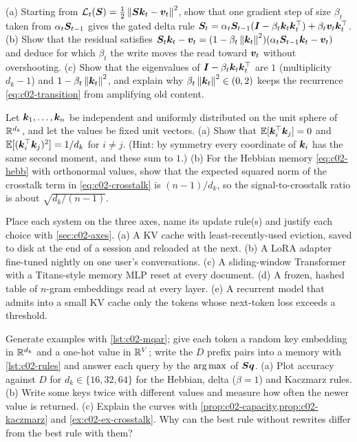 \begin{exercise}\label{ex:c02-ex-grad}
(a) Starting from $\mathcal{L}_t(\bm{S}) = \tfrac12\left\lVert \bm{S}\bm{k}_t - \bm{v}_t\right\rVert^2$, show that one gradient step of
size $\beta_t$ taken from $\alpha_t\bm{S}_{t-1}$ gives the gated delta rule
$\bm{S}_t = \alpha_t\bm{S}_{t-1}(\bm{I} - \beta_t\bm{k}_t\bm{k}_t^{\top}) + \beta_t\bm{v}_t\bm{k}_t^{\top}$.
(b) Show that the residual satisfies $\bm{S}_t\bm{k}_t - \bm{v}_t = (1 - \beta_t\left\lVert \bm{k}_t\right\rVert^2)(\alpha_t\bm{S}_{t-1}\bm{k}_t - \bm{v}_t)$
and deduce for which $\beta_t$ the write moves the read toward $\bm{v}_t$ without overshooting.
(c) Show that the eigenvalues of $\bm{I} - \beta_t\bm{k}_t\bm{k}_t^{\top}$ are $1$ (multiplicity $d_k - 1$) and
$1 - \beta_t\left\lVert \bm{k}_t\right\rVert^2$, and explain why $\beta_t\left\lVert \bm{k}_t\right\rVert^2 \in (0, 2)$ keeps the recurrence
\eqref{eq:c02-transition} from amplifying old content.
\end{exercise}

\begin{exercise}\label{ex:c02-ex-crosstalk}
Let $\bm{k}_1,\dots,\bm{k}_n$ be independent and uniformly distributed on the unit sphere of $\mathbb{R}^{d_k}$,
and let the values be fixed unit vectors.
(a) Show that $\mathbb{E}[\bm{k}_i^{\top}\bm{k}_j] = 0$ and $\mathbb{E}[(\bm{k}_i^{\top}\bm{k}_j)^2] = 1/d_k$ for $i \ne j$. (Hint: by
symmetry every coordinate of $\bm{k}_i$ has the same second moment, and these sum to $1$.)
(b) For the Hebbian memory \eqref{eq:c02-hebb} with orthonormal values, show that the expected
squared norm of the crosstalk term in \eqref{eq:c02-crosstalk} is $(n-1)/d_k$, so the
signal-to-crosstalk ratio is about $\sqrt{d_k/(n-1)}$.
\end{exercise}

\begin{exercise}\label{ex:c02-ex-classify}
Place each system on the three axes, name its update rule(s) and justify each choice with
\cref{sec:c02-axes}. (a) A KV cache with least-recently-used eviction, saved to disk at the end of a
session and reloaded at the next. (b) A LoRA adapter fine-tuned nightly on one user's conversations.
(c) A sliding-window Transformer with a Titans-style memory MLP reset at every document. (d) A frozen,
hashed table of $n$-gram embeddings read at every layer. (e) A recurrent model that admits into a
small KV cache only the tokens whose next-token loss exceeds a threshold.
\end{exercise}

\begin{exercise}\label{ex:c02-ex-mqar}
Generate examples with \cref{lst:c02-mqar}; give each token a random key embedding in $\mathbb{R}^{d_k}$ and a
one-hot value in $\mathbb{R}^{V}$; write the $D$ prefix pairs into a memory with \cref{lst:c02-rules} and
answer each query by the $\operatorname*{arg\,max}$ of $\bm{S}\bm{q}$. (a) Plot accuracy against $D$ for
$d_k \in \{16, 32, 64\}$ for the Hebbian, delta ($\beta = 1$) and Kaczmarz rules. (b) Write some keys
twice with different values and measure how often the newer value is returned. (c) Explain the
curves with \cref{prop:c02-capacity,prop:c02-kaczmarz} and \cref{ex:c02-ex-crosstalk}. Why can the
best rule without rewrites differ from the best rule with them?
\end{exercise}

